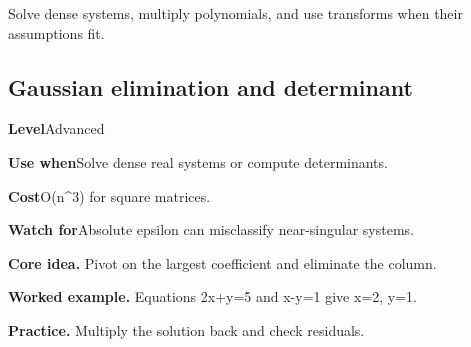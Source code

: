 \documentclass[10pt,letterpaper]{article}
\newcommand{\entrylabel}[1]{\textcolor{accent}{\bfseries #1}}
\begin{document}
\begin{guidebox}Solve dense systems, multiply polynomials, and use transforms when their assumptions fit.\end{guidebox}
\subsection{Gaussian elimination and determinant}
\begin{guidebox}\small
\entrylabel{Level}\quad Advanced\par
\entrylabel{Use when}\quad Solve dense real systems or compute determinants.\par
\entrylabel{Cost}\quad O(n\textasciicircum{}3) for square matrices.\par
\entrylabel{Watch for}\quad Absolute epsilon can misclassify near-singular systems.\par
\end{guidebox}
\noindent\textbf{Core idea.} Pivot on the largest coefficient and eliminate the column.\par
\noindent\textbf{Worked example.} Equations 2x+y=5 and x-y=1 give x=2, y=1.\par
\noindent\textbf{Practice.} Multiply the solution back and check residuals.\par
\end{document}

